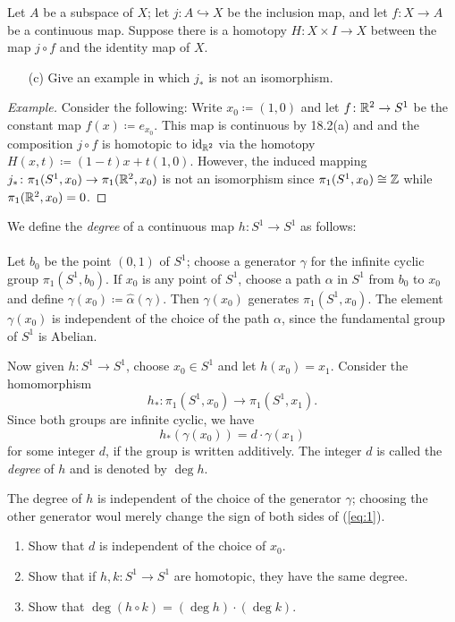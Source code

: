 \begin{problem}[Munkres \S58, Ex.\,7(c)]
Let $A$ be a subspace of $X$; let $j\colon A\hookrightarrow X$ be the
inclusion map, and let $f\colon X\to A$ be a continuous map. Suppose there
is a homotopy $H\colon X\times I\to X$ between the map $j\circ f$ and the
identity map of $X$.
\begin{itemize}
\item[(c)] Give an example in which $j_*$ is not an isomorphism.
\end{itemize}
\end{problem}
\begin{proof}[Example]
\renewcommand\qedsymbol{$\spadesuit$}
Consider the following: Write $x_0\coloneqq(1,0)$ and let $f\colon\mathbb{R}^2\to
S^1$ be the constant map $f(x)\coloneqq e_{x_0}$. This map is continuous by
18.2(a) and and the composition $j\circ f$ is homotopic to $\operatorname{id}_{\mathbb{R}^2}$
via the homotopy $H(x,t)\coloneqq (1-t)x+t(1,0)$. However, the induced
mapping $j_*\colon\pi_1(S^1,x_0)\to\pi_1(\mathbb{R}^2,x_0)$ is not an isomorphism
since $\pi_1(S^1,x_0)\cong\mathbb{Z}$ while $\pi_1(\mathbb{R}^2,x_0)=0$.
\end{proof}
\newpage
\begin{problem}[Munkres \S58, Ex.9(a,b,c)]
We define the \emph{degree} of a continuous map $h\colon S^1\to S^1$ as
follows:
\\\\
Let $b_0$ be the point $(0,1)$ of $S^1$; choose a generator $\gamma$ for
the infinite cyclic group $\pi_1(S^1,b_0)$. If $x_0$ is any point of $S^1$,
choose a path $\alpha$ in $S^1$ from $b_0$ to $x_0$ and define
$\gamma(x_0)\coloneqq\hat\alpha(\gamma)$. Then $\gamma(x_0)$ generates
$\pi_1(S^1,x_0)$. The element $\gamma(x_0)$ is independent of the choice of
the path $\alpha$, since the fundamental group of $S^1$ is Abelian.

Now given $h\colon S^1\to S^1$, choose $x_0\in S^1$ and let
$h(x_0)=x_1$. Consider the homomorphism
\[
h_*\colon\pi_1(S^1,x_0)\longrightarrow\pi_1(S^1,x_1).
\]
Since both groups are infinite cyclic, we have
\begin{equation}
\label{eq:1}
\tag{*}
h_*(\gamma(x_0))=d\cdot\gamma(x_1)
\end{equation}
for some integer $d$, if the group is written additively. The integer $d$
is called the \emph{degree} of $h$ and is denoted by $\deg h$.

The degree of $h$ is independent of the choice of the generator $\gamma$;
choosing the other generator woul merely change the sign of both sides of
(\ref{eq:1}).
\begin{enumerate}[label=(\alph*)]
\item Show that $d$ is independent of the choice of $x_0$.
\item Show that if $h,k\colon S^1\to S^1$ are homotopic, they have the same
  degree.
\item Show that $\deg(h\circ k)=(\deg h)\cdot(\deg k)$.
\end{enumerate}
\end{problem}

